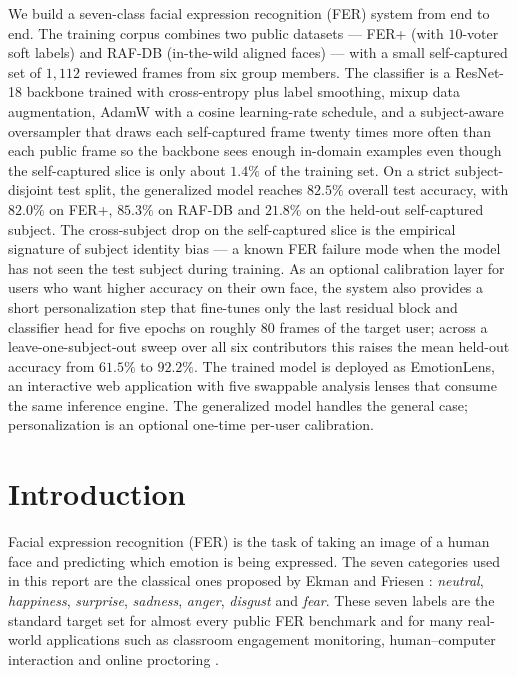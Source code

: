 \documentclass[12pt,a4paper]{article}
\renewenvironment{abstract}{%
  \begin{center}\Large\bfseries\abstractname\end{center}
  \vspace{-1em}
  \list{}{\leftmargin=0pt \rightmargin=0pt \listparindent=0pt \itemindent=0pt}\item\relax}
{\endlist}
\begin{document}
\tableofcontents
\newpage

\begin{abstract}
We build a seven-class facial expression recognition (FER)
system from end to end. The training corpus combines two
public datasets --- FER+ (with $10$-voter soft labels) and
RAF-DB (in-the-wild aligned faces) --- with a small
self-captured set of $1{,}112$ reviewed frames from six group
members. The classifier is a ResNet-18 backbone trained with
cross-entropy plus label smoothing, mixup data augmentation,
AdamW with a cosine learning-rate schedule, and a
subject-aware oversampler that draws each self-captured frame
twenty times more often than each public frame so the
backbone sees enough in-domain examples even though the
self-captured slice is only about $1.4\%$ of the training
set. On a strict subject-disjoint test split, the generalized
model reaches $82.5\%$ overall test accuracy, with $82.0\%$
on FER+, $85.3\%$ on RAF-DB and $21.8\%$ on the held-out
self-captured subject. The cross-subject drop on the
self-captured slice is the empirical signature of subject
identity bias --- a known FER failure mode when the model has
not seen the test subject during training. As an optional
calibration layer for users who want higher accuracy on their
own face, the system also provides a short personalization
step that fine-tunes only the last residual block and
classifier head for five epochs on roughly $80$ frames of the
target user; across a leave-one-subject-out sweep over all
six contributors this raises the mean held-out accuracy from
$61.5\%$ to $92.2\%$. The trained model is deployed as
EmotionLens, an interactive web application with five
swappable analysis lenses that consume the same inference
engine. The generalized model handles the general case;
personalization is an optional one-time per-user calibration.
\end{abstract}

\newpage

\section{Introduction}
\label{sec:intro}

Facial expression recognition (FER) is the task of taking an
image of a human face and predicting which emotion is being
expressed. The seven categories used in this report are the
classical ones proposed by
Ekman and Friesen \autocite{ekman1971constants}:
\emph{neutral}, \emph{happiness}, \emph{surprise},
\emph{sadness}, \emph{anger}, \emph{disgust} and \emph{fear}.
These seven labels are the standard target set for almost
every public FER benchmark and for many real-world applications
such as classroom engagement monitoring, human--computer
interaction and online proctoring
\autocite{savchenko2022hsemotion}.
\end{document}
